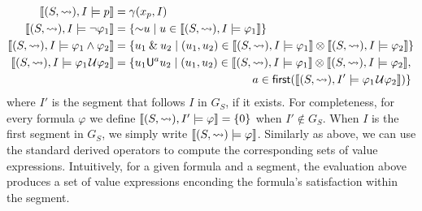 \small
\begin{align*}
	\llbracket (S, {\hb}), I \models p \rrbracket &= \gamma(x_p, I) \\
	\llbracket (S, {\hb}), I \models \lnot \varphi_1 \rrbracket &= \{\BitNeg u \st u \in  \llbracket (S, {\hb}), I \models \varphi_1 \rrbracket \} \\
	\llbracket (S, {\hb}), I \models \varphi_1 \land \varphi_2 \rrbracket &= \{ u_1 \BitAnd u_2 \st (u_1, u_2) \in \llbracket (S, {\hb}), I \models \varphi_1 \rrbracket \otimes \llbracket (S, {\hb}), I \models \varphi_2 \rrbracket  \} \\
	\llbracket (S, {\hb}), I \models \varphi_1 \until \varphi_2 \rrbracket &= \{ u_1 \mathsf{U}^a u_2 \st (u_1, u_2) \in \llbracket (S, {\hb}), I \models \varphi_1 \rrbracket \otimes \llbracket (S, {\hb}), I \models \varphi_2 \rrbracket, \\
	 &\hspace{12.2em} a \in \first(\llbracket (S, {\hb}), I' \models \varphi_1 \until \varphi_2 \rrbracket) \}
\end{align*}
\normalsize
where $I'$ is the segment that follows $I$ in $G_S$, if it exists.
For completeness, for every formula $\varphi$ we define $\llbracket (S, {\rightsquigarrow}), I' \models \varphi \rrbracket = \{0\}$ when $I' \notin G_S$.
When $I$ is the first segment in $G_S$, we simply write $\llbracket (S, {\rightsquigarrow}) \models \varphi \rrbracket$.
Similarly as above, we can use the standard derived operators to compute the corresponding sets of value expressions.
Intuitively, for a given formula and a segment, the evaluation above produces a set of value expressions enconding the formula's satisfaction within the segment.

